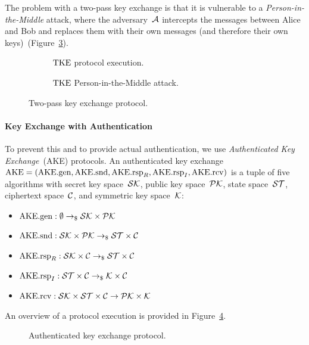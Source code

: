 The problem with a two-pass key exchange is that it is vulnerable to a \emph{Person-in-the-Middle} attack, where the adversary~$\mathcal{A}$ intercepts the messages between Alice and Bob and replaces them with their own messages (and therefore their own keys)~(Figure~\ref{fig:tke:MitM}).

\begin{figure}[!ht]
    \centering
    \begin{subfigure}{.49\textwidth}
        \centering
        
        \caption{$\mathrm{TKE}$ protocol execution.}
        \label{fig:tke:overview}
    \end{subfigure}\hfill
    \begin{subfigure}{.49\textwidth}
        \centering
        
        \caption{$\mathrm{TKE}$ Person-in-the-Middle attack.}
        \label{fig:tke:MitM}
    \end{subfigure}
    \caption{Two-pass key exchange protocol.}
\end{figure}

\paragraph{Key Exchange with Authentication} To prevent this and to provide actual authentication, we use \emph{Authenticated Key Exchange}~(AKE) protocols.
An authenticated key exchange $\mathrm{AKE}=(\mathrm{AKE}.\mathrm{gen},\allowbreak\mathrm{AKE}.\mathrm{snd},\allowbreak\mathrm{AKE}.\mathrm{rsp}_R,\allowbreak\mathrm{AKE}.\mathrm{rsp}_I,\allowbreak\mathrm{AKE}.\mathrm{rcv})$ is a tuple of five algorithms with secret key space~$\mathcal{SK}$, public key space~$\mathcal{PK}$, state space~$\mathcal{ST}$, ciphertext space~$\mathcal{C}$, and symmetric key space~$\mathcal{K}$:
\begin{itemize}
    \item $\mathrm{AKE}.\mathrm{gen}: \emptyset \to_\$ \mathcal{SK}\times\mathcal{PK}$
    \item $\mathrm{AKE}.\mathrm{snd}: \mathcal{SK}\times\mathcal{PK} \to_\$ \mathcal{ST}\times\mathcal{C}$
    \item $\mathrm{AKE}.\mathrm{rsp}_R: \mathcal{SK}\times\mathcal{C} \to_\$ \mathcal{ST}\times\mathcal{C}$
    \item $\mathrm{AKE}.\mathrm{rsp}_I: \mathcal{ST}\times\mathcal{C} \to_\$ \mathcal{K}\times\mathcal{C}$
    \item $\mathrm{AKE}.\mathrm{rcv}: \mathcal{SK}\times\mathcal{ST}\times\mathcal{C} \to \mathcal{PK}\times\mathcal{K}$
\end{itemize}
%
An overview of a protocol execution is provided in Figure~\ref{fig:ake:overview}. 

\begin{figure}[!ht]
    \centering
    
    \caption{Authenticated key exchange protocol.}
    \label{fig:ake:overview}
\end{figure}

